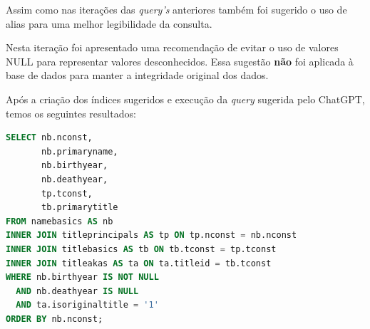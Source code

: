 \documentclass[12pt]{article}
\begin{document}
Assim como nas iterações das \emph{query's}  anteriores também foi sugerido o uso de alias para uma melhor legibilidade da consulta.

Nesta iteração foi apresentado uma recomendação de evitar o uso de valores NULL para representar valores desconhecidos. Essa sugestão \textbf{não} foi aplicada à base de dados para manter a integridade original dos dados.

Após a criação dos índices sugeridos e execução da \emph{query} sugerida pelo ChatGPT, temos os seguintes resultados:
\begin{lstlisting}[language=SQL, caption=Query 03 - ChatGPT]
SELECT nb.nconst,
       nb.primaryname,
       nb.birthyear,
       nb.deathyear,
       tp.tconst,
       tb.primarytitle
FROM namebasics AS nb
INNER JOIN titleprincipals AS tp ON tp.nconst = nb.nconst
INNER JOIN titlebasics AS tb ON tb.tconst = tp.tconst
INNER JOIN titleakas AS ta ON ta.titleid = tb.tconst
WHERE nb.birthyear IS NOT NULL
  AND nb.deathyear IS NULL
  AND ta.isoriginaltitle = '1'
ORDER BY nb.nconst;
\end{lstlisting}
\end{document}
